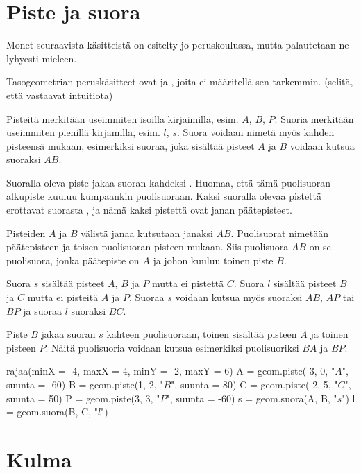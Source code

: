 \section*{Piste ja suora}

Monet seuraavista käsitteistä on esitelty jo peruskoulussa, mutta palautetaan ne lyhyesti
mieleen.

Tasogeometrian peruskäsitteet ovat  ja , joita ei
määritellä sen tarkemmin. (selitä, että vastaavat intuitiota)

Pisteitä merkitään useimmiten isoilla kirjaimilla, esim. $A$, $B$, $P$. Suoria merkitään useimmiten pienillä kirjamilla, esim. $l$, $s$. Suora voidaan nimetä myös kahden pisteensä mukaan, esimerkiksi suoraa, joka sisältää pisteet $A$ ja $B$ voidaan kutsua suoraksi $AB$.

Suoralla oleva piste jakaa suoran kahdeksi . Huomaa, että tämä puolisuoran
alkupiste kuuluu kumpaankin puolisuoraan. Kaksi suoralla olevaa pistettä erottavat suorasta
, ja nämä kaksi pistettä ovat janan päätepisteet.

Pisteiden $A$ ja $B$ välistä janaa kutsutaan janaksi $AB$. Puolisuorat nimetään päätepisteen ja toisen puolisuoran pisteen mukaan. Siis puolisuora $AB$ on se puolisuora, jonka päätepiste on $A$ ja johon kuuluu toinen piste $B$.

\begin{esimerkki}
Suora $s$ sisältää pisteet $A$, $B$ ja $P$ mutta ei pistettä $C$. Suora $l$ sisältää pisteet $B$ ja $C$ mutta ei pisteitä $A$ ja $P$. Suoraa $s$ voidaan kutsua myös suoraksi $AB$, $AP$ tai $BP$ ja suoraa $l$ suoraksi $BC$.

Piste $B$ jakaa suoran $s$ kahteen puolisuoraan, toinen sisältää pisteen $A$ ja toinen pisteen $P$. Näitä puolisuoria voidaan kutsua esimerkiksi puolisuoriksi $BA$ ja $BP$.

\begin{center}
\begin{kuva}
	rajaa(minX = -4, maxX = 4, minY = -2, maxY = 6)
	A = geom.piste(-3, 0, "$A$", suunta = -60)
	B = geom.piste(1, 2, "$B$", suunta = 80)
	C = geom.piste(-2, 5, "$C$", suunta = 50)
	P = geom.piste(3, 3, "$P$", suunta = -60)
	s = geom.suora(A, B, "$s$")
	l = geom.suora(B, C, "$l$")
\end{kuva}
\end{center}
\end{esimerkki}

\section*{Kulma}

